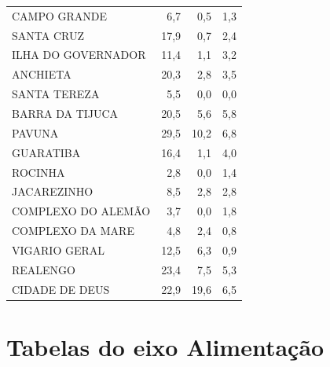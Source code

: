 \begin{apendicesenv}
{\begin{longtable}{@{}lrrr@{}}
CAMPO GRANDE & 6,7 & 0,5 & 1,3 \\
SANTA CRUZ & 17,9 & 0,7 & 2,4 \\
ILHA DO GOVERNADOR & 11,4 & 1,1 & 3,2 \\
ANCHIETA & 20,3 & 2,8 & 3,5 \\
SANTA TEREZA & 5,5 & 0,0 & 0,0 \\
BARRA DA TIJUCA & 20,5 & 5,6 & 5,8 \\
PAVUNA & 29,5 & 10,2 & 6,8 \\
GUARATIBA & 16,4 & 1,1 & 4,0 \\
ROCINHA & 2,8 & 0,0 & 1,4 \\
JACAREZINHO & 8,5 & 2,8 & 2,8 \\
COMPLEXO DO ALEMÃO & 3,7 & 0,0 & 1,8 \\
COMPLEXO DA MARE & 4,8 & 2,4 & 0,8 \\
VIGARIO GERAL & 12,5 & 6,3 & 0,9 \\
REALENGO & 23,4 & 7,5 & 5,3 \\
CIDADE DE DEUS & 22,9 & 19,6 & 6,5 \\
\end{longtable}}
\vspace{-6pt}


\chapter{Tabelas do eixo Alimentação}\label{ap:eixo-6}


\end{apendicesenv}
